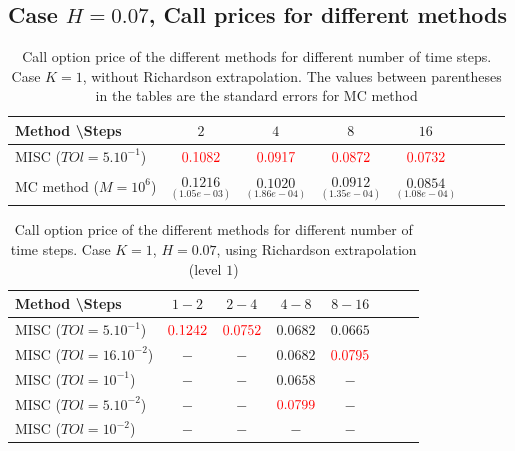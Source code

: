\documentclass[11pt]{article}
\begin{document}
\newpage
\subsection{Case $H=0.07$, Call prices for different methods}\label{appendix:Case $H=0.07$, Call prices for different methods}

\begin{table}[h!]
	\centering
	\begin{tabular}{l*{6}{c}r}
		Method \textbackslash  Steps            & $2$ & $4$ & $8$ & $16$  \\
		\hline
		MISC ($TOl=5.10^{-1}$)  & ${\color{red}0.1082}$ & ${\color{red}0.0917}$ & ${\color{red}0.0872}$ & ${\color{red}0.0732}$  \\
		MC method ($M=10^{6}$)   & $\underset{(1.05e-03)}{0.1216} $  & $\underset{(1.86e-04)}{0.1020} $  & $\underset{ (1.35e-04)}{0.0912}$ & $\underset {(1.08e-04)}{0.0854} $  \\		
		\hline
	\end{tabular}
	\caption{ Call option price of the different methods for different number of time steps. Case $K=1$, without Richardson extrapolation.  The values between parentheses in the tables are the standard errors for MC method}
	\label{table: Call option price of the different methods for different number of time steps. Case $K=1$, $H_007$}
\end{table}

\begin{table}[h!]
	\centering
	\begin{tabular}{l*{6}{c}r}
		Method \textbackslash  Steps    &$1-2$         & $2-4$ & $4-8$ & $8-16$\\
		\hline
		MISC ($TOl=5.10^{-1}$)  &${\color{red}0.1242}$ & ${\color{red}0.0752}$ & $0.0682$ & $0.0665$ \\
		MISC ($TOl=16.10^{-2}$)  &$-$ & $-$ & $0.0682$ & ${\color{red}0.0795}$  \\
		MISC ($TOl=10^{-1}$)  &$-$ & $-$ & $0.0658$ & $-$  \\
		MISC ($TOl=5.10^{-2}$)   &$-$ & $-$ & ${\color{red}0.0799}$ & $-$   \\
		MISC ($TOl=10^{-2}$)  &$-$ & $-$ & $-$ & $-$  \\	
		\hline
	\end{tabular}
	\caption{ Call option price of the different methods for different number of time steps. Case $K=1$, $H=0.07$, using Richardson extrapolation (level $1$)}
	\label{table: Call option price of the different methods for different number of time steps. Case $K=1$, $H=0.07$, using Richardson extrapolation}
\end{table}
\end{document}
